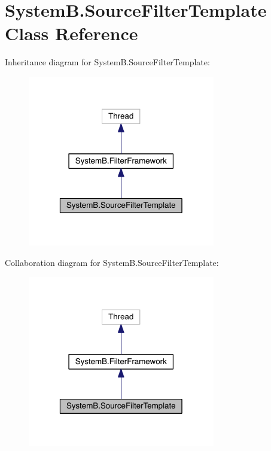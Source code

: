 \hypertarget{class_system_b_1_1_source_filter_template}{}\section{System\+B.\+Source\+Filter\+Template Class Reference}
\label{class_system_b_1_1_source_filter_template}


Inheritance diagram for System\+B.\+Source\+Filter\+Template\+:
\nopagebreak
\begin{figure}[H]
\begin{center}
\leavevmode
\includegraphics[width=232pt]{class_system_b_1_1_source_filter_template__inherit__graph}
\end{center}
\end{figure}


Collaboration diagram for System\+B.\+Source\+Filter\+Template\+:
\nopagebreak
\begin{figure}[H]
\begin{center}
\leavevmode
\includegraphics[width=232pt]{class_system_b_1_1_source_filter_template__coll__graph}
\end{center}
\end{figure}
